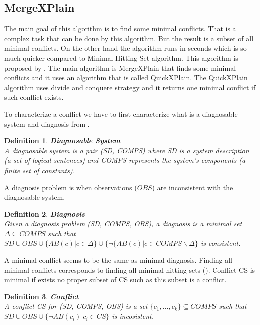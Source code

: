 \documentclass[12pt,a4paper]{article}
\newtheorem{definition}{Definition}[subsection]
\begin{document}
\subsection{MergeXPlain}
The main goal of this algorithm is to find some minimal conflicts. That is a complex task that can be done by this algorithm. But the result is a subset of all minimal conflicts. On the other hand the algorithm runs in seconds which is so much quicker compared to Minimal Hitting Set algorithm. This algorithm is proposed by \citep{MXP}. The main algorithm is MergeXPlain that finds some minimal conflicts and it uses an algorithm that is called QuickXPlain. The QuickXPlain algorithm uses divide and conquere strategy and it returns one minimal conflict if such conflict exists. 

To characterize a conflict we have to first characterize what is a diagnosable system and diagnosis from \citep{reiterHS}. 

\begin{definition}{\textbf{Diagnosable System}} \\
	\noindent A diagnosable system is a pair (SD, COMPS) where SD is a system description (a set of logical sentences) and COMPS represents the system's components (a finite set of constants).
\end{definition}

A diagnosis problem is when observations ($OBS$) are inconsistent with the diagnosable system.

\begin{definition}{\textbf{Diagnosis}} \\
	\noindent Given a diagnosis problem (SD, COMPS, OBS), a diagnosis is a minimal set $\Delta \subseteq COMPS$ such that $SD \cup OBS \cup \{ AB(c) | c \in \Delta \} \cup \{ \neg \{AB(c) | c \in COMPS \backslash \Delta \}$ is consistent.
\end{definition}

A minimal conflict seems to be the same as minimal diagnosis. Finding all minimal conflicts corresponds to finding all minimal hitting sets (\cite{reiterHS}). Conflict CS is minimal if exists no proper subset of CS such as this subset is a conflict.

\begin{definition}{\textbf{Conflict}} \\
	\noindent A conflict CS for (SD, COMPS, OBS) is a set $\{c_{1}, ..., c_{k}\} \subseteq COMPS$ such that $SD \cup OBS \cup \{ \neg AB(c_{i}) | c_{i} \in CS \} $ is incosistent.
\end{definition}
\end{document}
